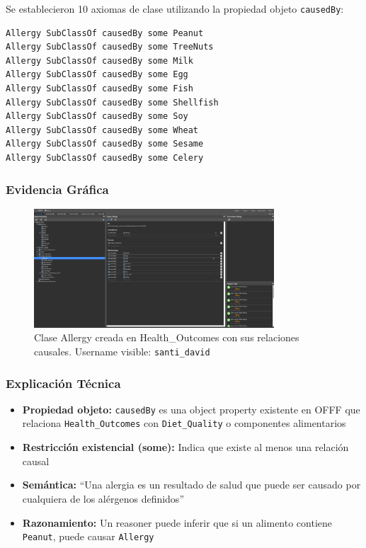 \documentclass[12pt,a4paper]{article}
\begin{document}
Se establecieron 10 axiomas de clase utilizando la propiedad objeto \texttt{causedBy}:

\begin{verbatim}
Allergy SubClassOf causedBy some Peanut
Allergy SubClassOf causedBy some TreeNuts
Allergy SubClassOf causedBy some Milk
Allergy SubClassOf causedBy some Egg
Allergy SubClassOf causedBy some Fish
Allergy SubClassOf causedBy some Shellfish
Allergy SubClassOf causedBy some Soy
Allergy SubClassOf causedBy some Wheat
Allergy SubClassOf causedBy some Sesame
Allergy SubClassOf causedBy some Celery
\end{verbatim}

\subsubsection{Evidencia Gráfica}

\begin{figure}[H]
    \centering
    \includegraphics[width=0.8\textwidth]{screenshots/allergy.png}
    \caption{Clase Allergy creada en Health\_Outcomes con sus relaciones causales. Username visible: \texttt{santi\_david}}
    \label{fig:allergy_class}
\end{figure}

\subsubsection{Explicación Técnica}

\begin{itemize}
    \item \textbf{Propiedad objeto:} \texttt{causedBy} es una object property existente en OFFF que relaciona \texttt{Health\_Outcomes} con \texttt{Diet\_Quality} o componentes alimentarios
    \item \textbf{Restricción existencial (some):} Indica que existe al menos una relación causal
    \item \textbf{Semántica:} ``Una alergia es un resultado de salud que puede ser causado por cualquiera de los alérgenos definidos''
    \item \textbf{Razonamiento:} Un reasoner puede inferir que si un alimento contiene \texttt{Peanut}, puede causar \texttt{Allergy}
\end{itemize}
\end{document}

